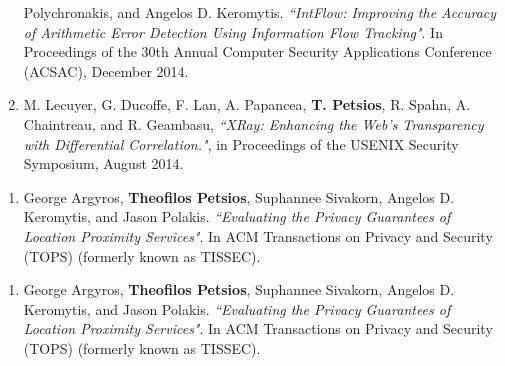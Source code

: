 \begin{cvparagraph}
\begin{enumerate}[label=C\arabic*]
        Polychronakis, and Angelos D. Keromytis. \textit{``IntFlow: Improving
        the Accuracy of Arithmetic Error Detection Using Information Flow
        Tracking"}. In Proceedings of the 30th Annual Computer Security
        Applications Conference (ACSAC), December 2014.\label{itm:intflow}
    \item M. Lecuyer, G. Ducoffe, F. Lan, A. Papancea, \textbf{T. Petsios}, R.
        Spahn, A. Chaintreau, and R. Geambasu, \textit{``XRay: Enhancing the
        Web's Transparency with Differential Correlation."}, in Proceedings of
        the USENIX Security Symposium, August 2014.\label{itm:xray}
\end{enumerate}
\end{cvparagraph}

\begin{cvparagraph}
\begin{enumerate}[label=J\arabic*]
    \item George Argyros, \textbf{Theofilos Petsios}, Suphannee Sivakorn,
        Angelos D. Keromytis, and Jason Polakis. \textit{``Evaluating the
        Privacy Guarantees of Location Proximity Services"}. In ACM
        Transactions on Privacy and Security (TOPS) (formerly known as
        TISSEC).\label{itm:istalker_tops}
\end{enumerate}
\end{cvparagraph}

\begin{cvparagraph}
\begin{enumerate}[label=O\arabic*]
    \item George Argyros, \textbf{Theofilos Petsios}, Suphannee Sivakorn,
        Angelos D. Keromytis, and Jason Polakis. \textit{``Evaluating the
        Privacy Guarantees of Location Proximity Services"}. In ACM
        Transactions on Privacy and Security (TOPS) (formerly known as
        TISSEC).\label{itm:istalker_tops}
\end{enumerate}
\end{cvparagraph}
